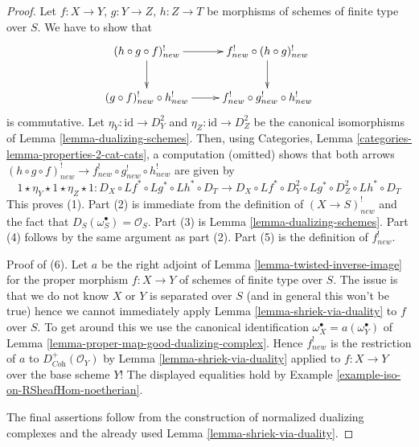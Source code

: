 \documentclass{stacks-project}
\theoremstyle{plain}
\theoremstyle{definition}
\theoremstyle{remark}
\numberwithin{equation}{subsection}
\begin{document}
\begin{proof}
Let $f : X \to Y$, $g : Y \to Z$, $h : Z \to T$ be morphisms of schemes
of finite type over $S$. We have to show that
$$
\xymatrix{
(h \circ g \circ f)^!_{new} \ar[r] \ar[d] &
f^!_{new} \circ (h \circ g)^!_{new} \ar[d] \\
(g \circ f)^!_{new} \circ h^!_{new} \ar[r] &
f^!_{new} \circ g^!_{new} \circ h^!_{new}
}
$$
is commutative. Let $\eta_Y : \text{id} \to D_Y^2$
and $\eta_Z : \text{id} \to D_Z^2$ be the canonical isomorphisms
of Lemma \ref{lemma-dualizing-schemes}. Then, using
Categories, Lemma \ref{categories-lemma-properties-2-cat-cats},
a computation (omitted) shows that both arrows
$(h \circ g \circ f)^!_{new} \to f^!_{new} \circ g^!_{new} \circ h^!_{new}$
are given by
$$
1 \star \eta_Y \star 1 \star \eta_Z \star 1 :
D_X \circ Lf^* \circ Lg^* \circ Lh^* \circ D_T
\longrightarrow
D_X \circ Lf^* \circ D_Y^2 \circ Lg^* \circ D_Z^2 \circ Lh^* \circ D_T
$$
This proves (1). Part (2) is immediate from the definition of
$(X \to S)^!_{new}$ and the fact that $D_S(\omega_S^\bullet) = \mathcal{O}_S$.
Part (3) is Lemma \ref{lemma-dualizing-schemes}.
Part (4) follows by the same argument as part (2).
Part (5) is the definition of $f^!_{new}$.

\medskip\noindent
Proof of (6). Let $a$ be the
right adjoint of Lemma \ref{lemma-twisted-inverse-image} for the
proper morphism $f : X \to Y$ of schemes of finite type over $S$.
The issue is that we do not know $X$ or $Y$ is
separated over $S$ (and in general this won't be true)
hence we cannot immediately apply
Lemma \ref{lemma-shriek-via-duality} to $f$ over $S$.
To get around this we use the canonical identification
$\omega_X^\bullet = a(\omega_Y^\bullet)$ of
Lemma \ref{lemma-proper-map-good-dualizing-complex}.
Hence $f^!_{new}$ is the restriction of $a$ to
$D_{\textit{Coh}}^+(\mathcal{O}_Y)$ by Lemma \ref{lemma-shriek-via-duality}
applied to $f : X \to Y$ over the base scheme $Y$!
The displayed equalities hold by
Example \ref{example-iso-on-RSheafHom-noetherian}.

\medskip\noindent
The final assertions follow from the construction of normalized
dualizing complexes and the already used Lemma \ref{lemma-shriek-via-duality}.
\end{proof}
\end{document}
